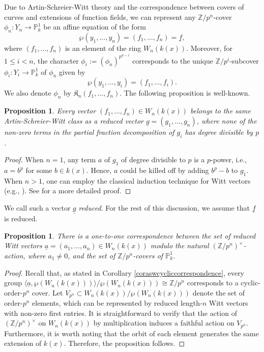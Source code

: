 \documentclass{compositio}
\newtheorem{proposition}[theorem]{Proposition}
\theoremstyle{remark}
\theoremstyle{remark}
\begin{document}
Due to Artin-Schreier-Witt theory and the correspondence between covers of curves and extensions of function fields, we can represent any $\mathbb{Z}/p^n$-cover $\phi_n: Y_n \to \mathbb{P}_k^1$ be an affine equation of the form
\begin{equation}
    \label{ASWeqn}
    \wp(y_1, \ldots, y_n)=(f_1, \ldots, f_n)=\underline{f},
\end{equation}
where $(f_1, \ldots, f_n)$ is an element of the ring $W_n(k(x))$. Moreover, for $1 \leq i < n$, the character $\phi_i:=(\phi_n)^{p^{n-i}}$ corresponds to the unique $\mathbb{Z}/p^i$-subcover $\phi_i: Y_i \to \mathbb{P}_k^1$ of $\phi_n$ given by
\begin{equation}
\label{eqnASWsub}
\wp(y_1, \ldots, y_i)=(f_1, \ldots, f_i).
\end{equation}
We also denote $\phi_n$ by $\mathfrak{K}_{n}(f_1, \ldots, f_n)$. The following proposition is well-known.
\begin{proposition}
\label{propreducedform}
    Every vector $(f_1, \ldots, f_n) \in W_n(k(x))$ belongs to the same Artin-Schreier-Witt class as a reduced vector $\underline{g}=(g_1, \ldots, g_n)$, where none of the non-zero terms in the partial fraction decomposition of $g_i$ has degree divisible by $p$.
\end{proposition}

\begin{proof}
    When $n=1$, any term $a$ of $g_1$ of degree divisible to $p$ is a $p$-power, i.e., $a=b^p$ for some $b \in k(x)$. Hence, $a$ could be killed off by adding $b^p-b$ to $g_1$. When $n>1$, one can employ the classical induction technique for Witt vectors (e.g., \cite[\S 26, Addendum]{MR2371763}). See \cite[Lemma A.2.3]{MR3714509} for a more detailed proof.
\end{proof}

We call such a vector $\underline{g}$ \textit{reduced}. For the rest of this discussion, we assume that $\underline{f}$ is reduced. 

\begin{proposition}
\label{prop1to1ASW}
    There is a one-to-one correspondence between the set of reduced Witt vectors $\underline{a}=(a_1, \ldots, a_n) \in W_n(k(x))$ modulo the natural $(\mathbb{Z}/p^n)^{\times}$-action, where $a_1 \neq 0$, and the set of $\mathbb{Z}/p^n$-covers of $\mathbb{P}^1_k$.
\end{proposition}

\begin{proof}
Recall that, as stated in Corollary \ref{coraswcycliccorrespondence}, every group $\langle \underline{a},\wp(W_n(k(x)))\rangle/ \wp(W_n(k(x))) \cong \mathbb{Z}/p^n$ corresponds to a cyclic-order-$p^n$ cover. Let $V_{p^n} \subset W_n(k(x))/\wp(W_n(k(x)))$ denote the set of order-$p^n$ elements, which can be represented by reduced length-$n$ Witt vectors with non-zero first entries. It is straightforward to verify that the action of $(\mathbb{Z}/p^n)^{\times}$ on $W_n(k(x))$ by multiplication induces a faithful action on $V_{p^n}$. Furthermore, it is worth noting that the orbit of each element generates the same extension of $k(x)$. Therefore, the proposition follows.
\end{proof}
\end{document}
